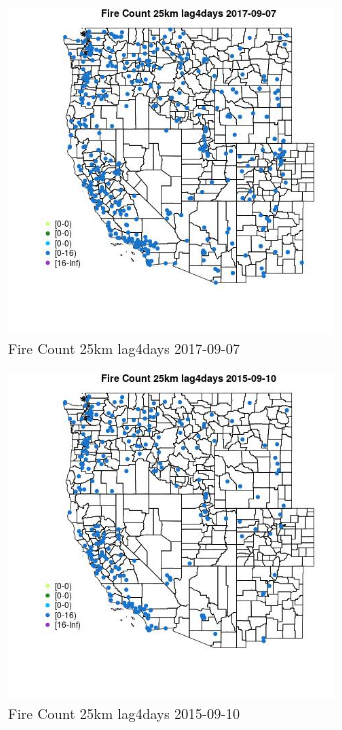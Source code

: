 \begin{figure} 
\centering  
\includegraphics[width=0.77\textwidth]{Code_Outputs/Report_ML_input_PM25_Step4_part_e_de_duplicated_aves_compiled_2019-05-20wNAs_MapObsFire_Count_25km_lag4days2017-09-07.jpg} 
\caption{\label{fig:Report_ML_input_PM25_Step4_part_e_de_duplicated_aves_compiled_2019-05-20wNAsMapObsFire_Count_25km_lag4days2017-09-07}Fire Count 25km lag4days 2017-09-07} 
\end{figure} 
 

\begin{figure} 
\centering  
\includegraphics[width=0.77\textwidth]{Code_Outputs/Report_ML_input_PM25_Step4_part_e_de_duplicated_aves_compiled_2019-05-20wNAs_MapObsFire_Count_25km_lag4days2015-09-10.jpg} 
\caption{\label{fig:Report_ML_input_PM25_Step4_part_e_de_duplicated_aves_compiled_2019-05-20wNAsMapObsFire_Count_25km_lag4days2015-09-10}Fire Count 25km lag4days 2015-09-10} 
\end{figure} 
 

